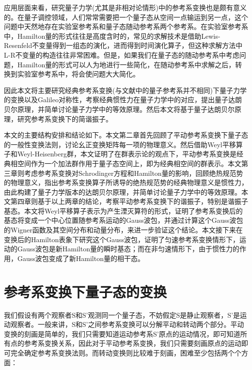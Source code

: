 \documentclass[a4paper]{article}
\begin{document}
        应用层面来看，研究量子力学(尤其是非相对论情形)中的参考系变换也是颇有意义的。在量子调控领域，人们常常需要把一个量子态从空间一点输运到另一点，这个问题中天然地存在实验室参考系和量子态随动参考系两个参考系。在实验室参考系中，Hamilton量的形式往往是高度含时的，常见的求解技术是借助Lewis-Resenfeld不变量\cite{bib:six, bib:seven}得到一组态的演化，进而得到时间演化算子，但这种求解方法中L-R不变量的构造往往非常困难。但是，如果我们在量子态的随动参考系中考虑问题，Hamilton量的形式可以人为地进行一些简化，在随动参考系中求解之后，转换到实验室参考系中，将会使问题大大简化。

        因此本文将主要研究经典参考系变换(与文献\cite{bib:three}中的量子参考系并不相同)下量子力学的变换以及Galileo对称性，考察经典惯性力在量子力学中的对应，提出量子达朗贝尔原理，并简单讨论量子力学中的等效原理。然后本文将基于量子达朗贝尔原理，研究参考系变换下的简谐振子。

        本文的主要结构安排和结论如下。本文第二章首先回顾了平动参考系变换下量子态的一般性变换法则，讨论幺正变换矩阵每一项的物理意义。然后借助Weyl平移算子和Weyl-Heisenberg群，本文证明了在群表示论的观点下，平动参考系变换是经典相空间作为一个加法群作用于量子态空间上，即为经典相空间的群表示。本文第三章则考虑参考系变换对Schrodinger方程和Hamilton量的影响，回顾绝热规范势的物理意义，指出参考系变换算子所诱导的绝热规范势的经典物理意义是惯性力，由此构建了量子力学版本的达朗贝尔原理，并简单讨论量子力学中的等效原理。本文第四章则基于以上两章的结论，考察平动参考系变换下的谐振子，特别是谐振子基态。本文将Weyl平移算子表示为产生湮灭算符的形式，证明了参考系变换后的基态将变成一个中心位置随参考系运动的Gauss波包，并通过计算这个Gauss波包的Wigner函数及其空间分布和动量分布，来进一步验证这个结论。本文接下来在变换后的Hamilton表象下研究这个Gauss波包，证明了匀速参考系变换情形下，运动的Gauss波包是新Hamilton量的瞬时基态；而在非匀速情形下，由于惯性力的作用，Gauss波包变成了新Hamilton量的相干态。



    \section{参考系变换下量子态的变换}

        我们假设有两个观察者S和S'观测同一个量子态，不妨假定S是静止观察者，S'是运动观察者。一般来讲，S和S'之间参考系变换可以分解平动和转动两个部分。平动变换的刻画是简单的，我们只需要知道运动参考系S'原点的运动情况，即可知道所有点的参考系变换关系，因此对于平动参考系变换，我们只需要刻画原点的运动即可完全确定参考系变换法则。而转动变换则比较难于刻画，困难至少包括两个个方面：
            
\end{document}
